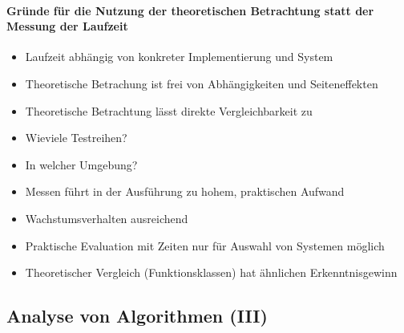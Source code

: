 \documentclass[
    ngerman,
    color=3b,
    dark_mode,
    load_common, %
    summary,
    boxarc,
]{tuda_summary}
\begin{document}
\paragraph{Gründe für die Nutzung der theoretischen Betrachtung statt der Messung der Laufzeit }
\begin{description}[itemsep=1em]
    \item [Vergleichbarkeit]
          \begin{itemize}
              \item Laufzeit abhängig von konkreter Implementierung und System
              \item Theoretische Betrachung ist frei von Abhängigkeiten und Seiteneffekten
              \item Theoretische Betrachtung lässt direkte Vergleichbarkeit zu
          \end{itemize}

    \item [Aufwand]
          \begin{itemize}
              \item Wieviele Testreihen?
              \item In welcher Umgebung?
              \item Messen führt in der Ausführung zu hohem, praktischen Aufwand
          \end{itemize}

    \item [Komplexitätsfunktion]
          \begin{itemize}
              \item Wachstumsverhalten ausreichend
              \item Praktische Evaluation mit Zeiten nur für Auswahl von Systemen möglich
              \item Theoretischer Vergleich (Funktionsklassen) hat ähnlichen Erkenntnisgewinn
          \end{itemize}
\end{description}
\clearpage
\subsection{Analyse von Algorithmen \textmd{(III)}}\label{Analyse von Algorithmen 3}
\end{document}
